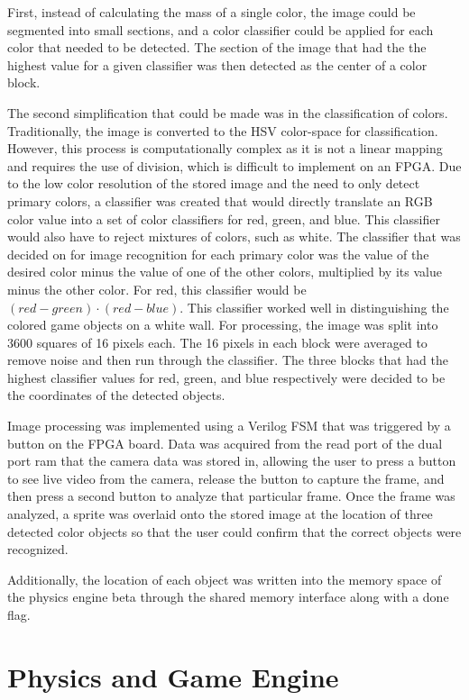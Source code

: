 \documentclass{article}
\begin{document}
First, instead of calculating the mass of a single color, the image could be segmented into small sections, and a color classifier could be applied for each color that needed to be detected. The section of the image that had the the highest value for a given classifier was then detected as the center of a color block. 

The second simplification that could be made was in the classification of colors. Traditionally, the image is converted to the HSV color-space for classification. However, this process is computationally complex as it is not a linear mapping and requires the use of division, which is difficult to implement on an FPGA. Due to the low color resolution of the stored image and the need to only detect primary colors, a classifier was created that would directly translate an RGB color value into a set of color classifiers for red, green, and blue. This classifier would also have to reject mixtures of colors, such as white.
The classifier that was decided on for image recognition for each primary color was the value of the desired color minus the value of one of the other colors, multiplied by its value minus the other color. For red, this classifier would be $(red-green)\cdot(red-blue)$. This classifier worked well in distinguishing the colored game objects on a white wall. For processing, the image was split into 3600 squares of 16 pixels each. The 16 pixels in each block were averaged to remove noise and then run through the classifier. The three blocks that had the highest classifier values for red, green, and blue respectively were decided to be the coordinates of the detected objects. 

Image processing was implemented using a Verilog FSM that was triggered by a button on the FPGA board. Data was acquired from the read port of the dual port ram that the camera data was stored in, allowing the user to press a button to see live video from the camera, release the button to capture the frame, and then press a second button to analyze that particular frame. Once the frame was analyzed, a sprite was overlaid onto the stored image at the location of three detected color objects so that the user could confirm that the correct objects were recognized.

 Additionally, the location of each object was written into the memory space of the physics engine beta through the shared memory interface along with a done flag. 
 
\section{Physics and Game Engine} \label{physics}
\end{document}
